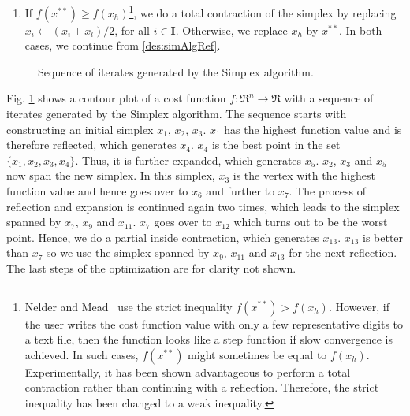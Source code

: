 \begin{enumerate}
\item \label{des:simAlgCheWor}
If $f(x^{**}) \ge f(x_h)$\footnote{ Nelder and Mead~\cite{NelderMea1965} use the strict 
inequality $f(x^{**}) > f(x_h)$.
However, if the user writes the cost function value with only a few 
representative digits to a text file, 
then the function looks like a step function if slow convergence is 
achieved. In such cases, $f(x^{**})$ might sometimes be equal to $f(x_h)$.
Experimentally, it has been shown 
advantageous to perform a total contraction rather than continuing with a reflection. 
Therefore, the strict inequality has been changed to a weak inequality.},
we do a total contraction of the 
simplex by replacing $x_i \leftarrow (x_i + x_l)/2$, for all $i \in \mathbf I$.
Otherwise, we replace $x_h$ by $x^{**}$. 
In both cases, we continue from \ref{des:simAlgRef}.
\end{enumerate}

\begin{figure}
\centering
{}
\caption{Sequence of iterates generated by the Simplex algorithm.}
\label{fig:simSeqAlg}
\end{figure}



Fig. \ref{fig:simSeqAlg} shows a contour plot of a cost function $f \colon \Re^n \to \Re$ with a sequence of iterates
generated by the Simplex algorithm.
The sequence starts with 
constructing an initial simplex $x_1$, $x_2$, $x_3$. $x_1$ has the highest function value and is therefore 
reflected, which generates $x_4$. $x_4$ is the best point in the set $\{x_1, x_2, x_3, x_4\}$. Thus, it is further 
expanded, which generates $x_5$. $x_2$, $x_3$ and $x_5$ now span the new simplex. In this simplex, $x_3$ is the 
vertex with the highest function value and hence goes over to $x_6$ and further to $x_7$. The process of reflection 
and expansion is continued again two times, which leads to the simplex spanned by $x_7$, $x_9$ and 
$x_{11}$. $x_7$ goes over to $x_{12}$ which turns out to be the worst point. Hence, we do a partial inside 
contraction, which generates $x_{13}$. $x_{13}$ is better than $x_7$ so we use the simplex spanned by $x_9$, 
$x_{11}$ and $x_{13}$ for the next reflection. 
The last steps of the optimization are for clarity not shown.



